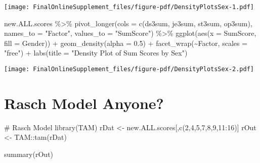 \documentclass[
  letterpaper,
  DIV=11,
  numbers=noendperiod]{scrartcl}
\newenvironment{Shaded}{\begin{snugshade}}{\end{snugshade}}
\newcommand{\AttributeTok}[1]{\textcolor[rgb]{0.40,0.45,0.13}{#1}}
\newcommand{\CommentTok}[1]{\textcolor[rgb]{0.37,0.37,0.37}{#1}}
\newcommand{\DecValTok}[1]{\textcolor[rgb]{0.68,0.00,0.00}{#1}}
\newcommand{\FloatTok}[1]{\textcolor[rgb]{0.68,0.00,0.00}{#1}}
\newcommand{\FunctionTok}[1]{\textcolor[rgb]{0.28,0.35,0.67}{#1}}
\newcommand{\NormalTok}[1]{\textcolor[rgb]{0.00,0.23,0.31}{#1}}
\newcommand{\OtherTok}[1]{\textcolor[rgb]{0.00,0.23,0.31}{#1}}
\newcommand{\SpecialCharTok}[1]{\textcolor[rgb]{0.37,0.37,0.37}{#1}}
\newcommand{\StringTok}[1]{\textcolor[rgb]{0.13,0.47,0.30}{#1}}
\begin{document}
\texttt{[image: FinalOnlineSupplement\_files/figure-pdf/DensityPlotsSex-1.pdf]}

\begin{Shaded}
\begin{Highlighting}[]
\NormalTok{new.ALL.scores }\SpecialCharTok{\%\textgreater{}\%}
  \FunctionTok{pivot\_longer}\NormalTok{(}\AttributeTok{cols =} \FunctionTok{c}\NormalTok{(ds3sum, je3sum, st3sum, op3sum), }
               \AttributeTok{names\_to =} \StringTok{"Factor"}\NormalTok{, }
               \AttributeTok{values\_to =} \StringTok{"SumScore"}\NormalTok{) }\SpecialCharTok{\%\textgreater{}\%}
  \FunctionTok{ggplot}\NormalTok{(}\FunctionTok{aes}\NormalTok{(}\AttributeTok{x =}\NormalTok{ SumScore, }
             \AttributeTok{fill =}\NormalTok{ Gender)) }\SpecialCharTok{+}
  \FunctionTok{geom\_density}\NormalTok{(}\AttributeTok{alpha =} \FloatTok{0.5}\NormalTok{) }\SpecialCharTok{+}
  \FunctionTok{facet\_wrap}\NormalTok{(}\SpecialCharTok{\textasciitilde{}}\NormalTok{Factor, }\AttributeTok{scales =} \StringTok{"free"}\NormalTok{) }\SpecialCharTok{+}
  \FunctionTok{labs}\NormalTok{(}\AttributeTok{title =} \StringTok{"Density Plot of Sum Scores by Sex"}\NormalTok{)}
\end{Highlighting}
\end{Shaded}

\texttt{[image: FinalOnlineSupplement\_files/figure-pdf/DensityPlotsSex-2.pdf]}

\section{Rasch Model Anyone?}\label{rasch-model-anyone}

\begin{Shaded}
\begin{Highlighting}[]
\CommentTok{\# Rasch Model}
\FunctionTok{library}\NormalTok{(TAM)}
\NormalTok{rDat }\OtherTok{\textless{}{-}}\NormalTok{ new.ALL.scores[,}\FunctionTok{c}\NormalTok{(}\DecValTok{2}\NormalTok{,}\DecValTok{4}\NormalTok{,}\DecValTok{5}\NormalTok{,}\DecValTok{7}\NormalTok{,}\DecValTok{8}\NormalTok{,}\DecValTok{9}\NormalTok{,}\DecValTok{11}\SpecialCharTok{:}\DecValTok{16}\NormalTok{)] }
\NormalTok{rOut }\OtherTok{\textless{}{-}}\NormalTok{ TAM}\SpecialCharTok{::}\FunctionTok{tam}\NormalTok{(rDat)}
\end{Highlighting}
\end{Shaded}

\begin{Shaded}
\begin{Highlighting}[]
\FunctionTok{summary}\NormalTok{(rOut)}
\end{Highlighting}
\end{Shaded}
\end{document}
